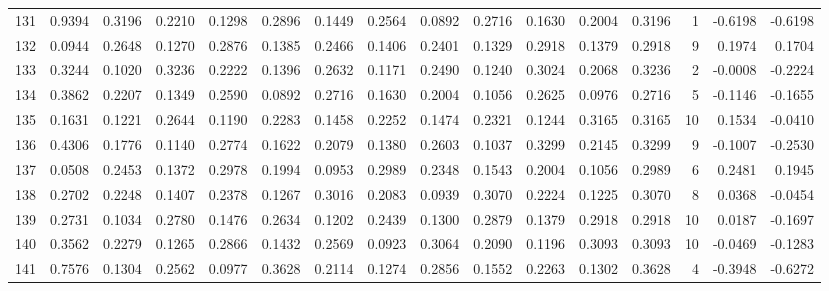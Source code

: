 \begin{tabular}{lrrrrrrrrrrrrrrr}
131 &      0.9394 &  0.3196 &  0.2210 &  0.1298 &  0.2896 &  0.1449 &  0.2564 &  0.0892 &  0.2716 &  0.1630 &   0.2004 &     0.3196 &      1 &                   -0.6198 &                    -0.6198 \\
132 &      0.0944 &  0.2648 &  0.1270 &  0.2876 &  0.1385 &  0.2466 &  0.1406 &  0.2401 &  0.1329 &  0.2918 &   0.1379 &     0.2918 &      9 &                    0.1974 &                     0.1704 \\
133 &      0.3244 &  0.1020 &  0.3236 &  0.2222 &  0.1396 &  0.2632 &  0.1171 &  0.2490 &  0.1240 &  0.3024 &   0.2068 &     0.3236 &      2 &                   -0.0008 &                    -0.2224 \\
134 &      0.3862 &  0.2207 &  0.1349 &  0.2590 &  0.0892 &  0.2716 &  0.1630 &  0.2004 &  0.1056 &  0.2625 &   0.0976 &     0.2716 &      5 &                   -0.1146 &                    -0.1655 \\
135 &      0.1631 &  0.1221 &  0.2644 &  0.1190 &  0.2283 &  0.1458 &  0.2252 &  0.1474 &  0.2321 &  0.1244 &   0.3165 &     0.3165 &     10 &                    0.1534 &                    -0.0410 \\
136 &      0.4306 &  0.1776 &  0.1140 &  0.2774 &  0.1622 &  0.2079 &  0.1380 &  0.2603 &  0.1037 &  0.3299 &   0.2145 &     0.3299 &      9 &                   -0.1007 &                    -0.2530 \\
137 &      0.0508 &  0.2453 &  0.1372 &  0.2978 &  0.1994 &  0.0953 &  0.2989 &  0.2348 &  0.1543 &  0.2004 &   0.1056 &     0.2989 &      6 &                    0.2481 &                     0.1945 \\
138 &      0.2702 &  0.2248 &  0.1407 &  0.2378 &  0.1267 &  0.3016 &  0.2083 &  0.0939 &  0.3070 &  0.2224 &   0.1225 &     0.3070 &      8 &                    0.0368 &                    -0.0454 \\
139 &      0.2731 &  0.1034 &  0.2780 &  0.1476 &  0.2634 &  0.1202 &  0.2439 &  0.1300 &  0.2879 &  0.1379 &   0.2918 &     0.2918 &     10 &                    0.0187 &                    -0.1697 \\
140 &      0.3562 &  0.2279 &  0.1265 &  0.2866 &  0.1432 &  0.2569 &  0.0923 &  0.3064 &  0.2090 &  0.1196 &   0.3093 &     0.3093 &     10 &                   -0.0469 &                    -0.1283 \\
141 &      0.7576 &  0.1304 &  0.2562 &  0.0977 &  0.3628 &  0.2114 &  0.1274 &  0.2856 &  0.1552 &  0.2263 &   0.1302 &     0.3628 &      4 &                   -0.3948 &                    -0.6272 \\

\end{tabular}
